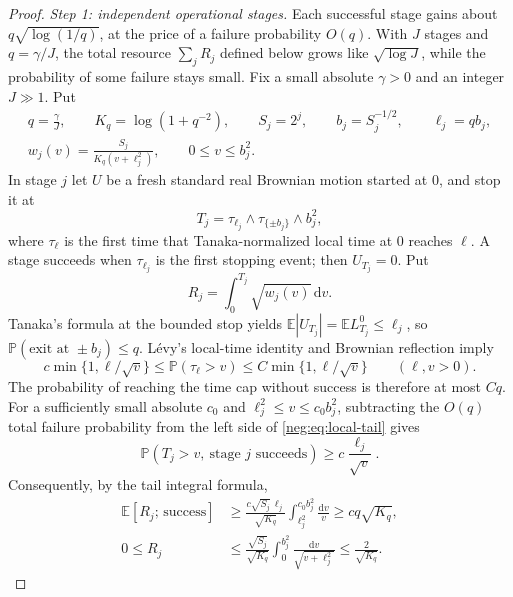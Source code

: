 \documentclass[11pt]{article}
\theoremstyle{definition}
\theoremstyle{remark}
\numberwithin{equation}{section}
\begin{document}
\begin{proof}
\emph{Step 1: independent operational stages.}
Each successful stage gains about $q\sqrt{\log(1/q)}$, at the price of
a failure probability $O(q)$. With $J$ stages and $q=\gamma/J$, the
total resource $\sum_jR_j$ defined below grows like $\sqrt{\log J}$, while the probability of some
failure stays small.
Fix a small absolute $\gamma>0$ and an integer $J\gg1$. Put
\[
 \begin{gathered}
 q=\frac\gamma J,\qquad K_q=\log(1+q^{-2}),\qquad
 S_j=2^j,\qquad b_j=S_j^{-1/2},\qquad \ell_j=q b_j,\\
 w_j(v)=\frac{S_j}{K_q(v+\ell_j^2)},\qquad 0\le v\le b_j^2.
 \end{gathered}
\]
In stage $j$ let $U$ be a fresh standard real Brownian motion started
at $0$, and stop it at
\[
 T_j=\tau_{\ell_j}\wedge\tau_{\{\pm b_j\}}\wedge b_j^2,
\]
where $\tau_{\ell}$ is the first time that Tanaka-normalized local time
at $0$ reaches $\ell$. A stage succeeds when $\tau_{\ell_j}$ is the
first stopping event; then $U_{T_j}=0$. Put
\[
 R_j=\int_0^{T_j}\sqrt{w_j(v)}\,\mathrm dv.
\]
Tanaka's formula at the bounded stop yields
$\mathbb E|U_{T_j}|=\mathbb EL^0_{T_j}\le\ell_j$, so
$\mathbb P(\text{exit at }\pm b_j)\le q$. L\'evy's local-time identity
and Brownian reflection imply
\begin{equation}\label{neg:eq:local-tail}
 c\min\{1,\ell/\sqrt v\}
 \le\mathbb P(\tau_\ell>v)
 \le C\min\{1,\ell/\sqrt v\}
 \qquad(\ell,v>0).
\end{equation}
The probability of reaching the time cap without success is therefore
at most $Cq$. For a sufficiently small absolute $c_0$ and
$\ell_j^2\le v\le c_0b_j^2$, subtracting the $O(q)$ total failure
probability from the left side of \eqref{neg:eq:local-tail} gives
\begin{equation}\label{neg:eq:successful-tail}
 \mathbb P(T_j>v,\ \text{stage $j$ succeeds})
      \ge c\frac{\ell_j}{\sqrt v}.
\end{equation}
Consequently, by the tail integral formula,
\begin{equation}\label{neg:eq:resource-bounds}
 \begin{aligned}
  \mathbb E[R_j;\,\text{success}]&\ge
  \frac{c\sqrt{S_j}\,\ell_j}{\sqrt{K_q}}
       \int_{\ell_j^2}^{c_0b_j^2}\frac{\mathrm dv}{v}
       \ge c q\sqrt{K_q},\\
  0\le R_j&\le\frac{\sqrt{S_j}}{\sqrt{K_q}}
      \int_0^{b_j^2}\frac{\mathrm dv}{\sqrt{v+\ell_j^2}}
       \le\frac2{\sqrt{K_q}}.
 \end{aligned}

\end{equation}
\end{proof}
\end{document}

